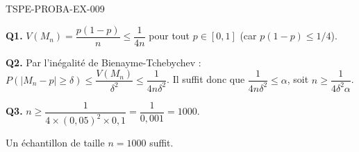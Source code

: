 \begin{corrige}{TSPE-PROBA-EX-009}

\textbf{Q1.} $V(M_n) = \dfrac{p(1-p)}{n} \leq \dfrac{1}{4n}$ pour tout $p \in [0,1]$ (car $p(1-p)\leq 1/4$).

\textbf{Q2.} Par l'inégalité de Bienayme-Tchebychev : $P(|M_n-p|\geq\delta) \leq \dfrac{V(M_n)}{\delta^2} \leq \dfrac{1}{4n\delta^2}$. Il suffit donc que $\dfrac{1}{4n\delta^2} \leq \alpha$, soit $n \geq \dfrac{1}{4\delta^2\alpha}$.

\textbf{Q3.} $n \geq \dfrac{1}{4\times(0{,}05)^2\times0{,}1} = \dfrac{1}{0{,}001} = 1000$.

Un échantillon de taille $\boxed{n=1000}$ suffit.

\end{corrige}
